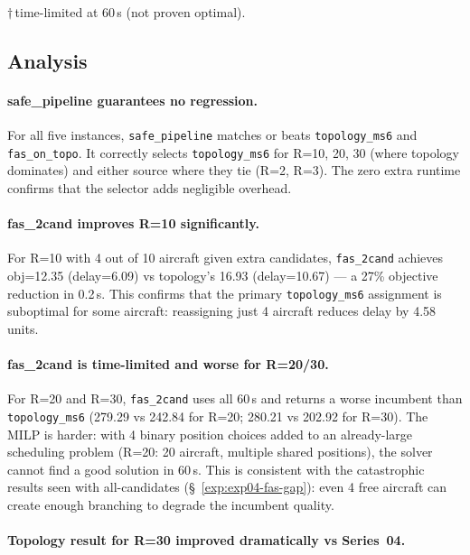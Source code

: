 \noindent $\dagger$\,time-limited at 60\,s (not proven optimal).

\subsection{Analysis}

\paragraph{safe\_pipeline guarantees no regression.}

For all five instances, \texttt{safe\_pipeline} matches or beats
\texttt{topology\_ms6} and \texttt{fas\_on\_topo}.  It correctly selects
\texttt{topology\_ms6} for R=10, 20, 30 (where topology dominates) and
either source where they tie (R=2, R=3).  The zero extra runtime confirms
that the selector adds negligible overhead.

\paragraph{fas\_2cand improves R=10 significantly.}

For R=10 with 4 out of 10 aircraft given extra candidates, \texttt{fas\_2cand}
achieves obj=12.35 (delay=6.09) vs topology's 16.93 (delay=10.67) — a 27\%
objective reduction in 0.2\,s.  This confirms that the primary \texttt{topology\_ms6}
assignment is suboptimal for some aircraft: reassigning just 4 aircraft reduces delay
by 4.58 units.

\paragraph{fas\_2cand is time-limited and worse for R=20/30.}

For R=20 and R=30, \texttt{fas\_2cand} uses all 60\,s and returns a worse
incumbent than \texttt{topology\_ms6} (279.29 vs 242.84 for R=20;
280.21 vs 202.92 for R=30).  The MILP is harder: with 4 binary position
choices added to an already-large scheduling problem (R=20: 20 aircraft,
multiple shared positions), the solver cannot find a good solution in 60\,s.
This is consistent with the catastrophic results seen with all-candidates
(\S~\ref{exp:exp04-fas-gap}): even 4 free aircraft can create enough branching
to degrade the incumbent quality.

\paragraph{Topology result for R=30 improved dramatically vs Series~04.}

